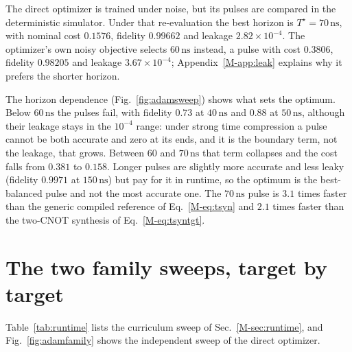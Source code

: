 \documentclass[aps,prx,twocolumn,superscriptaddress,nofootinbib,amsmath,amssymb,floatfix]{revtex4-2}
\newcommand{\ns}{\,\mathrm{ns}}
\begin{document}
The direct optimizer is trained under noise, but its pulses are compared in the deterministic simulator.
Under that re-evaluation the best horizon is $T^\star=70\ns$, with nominal cost $0.1576$, fidelity
$0.99662$ and leakage $2.82\times10^{-4}$. The optimizer's own noisy objective selects $60\ns$ instead, a
pulse with cost $0.3806$, fidelity $0.98205$ and leakage $3.67\times10^{-4}$; Appendix~\ref{M-app:leak}
explains why it prefers the shorter horizon.

The horizon dependence (Fig.~\ref{fig:adamsweep}) shows what sets the optimum. Below $60\ns$ the pulses
fail, with fidelity $0.73$ at $40\ns$ and $0.88$ at $50\ns$, although their leakage stays in the
$10^{-4}$ range: under strong time compression a pulse cannot be both accurate and zero at its ends, and
it is the boundary term, not the leakage, that grows. Between $60$ and $70\ns$ that term collapses and the
cost falls from $0.381$ to $0.158$. Longer pulses are slightly more accurate and less leaky (fidelity
$0.9971$ at $150\ns$) but pay for it in runtime, so the optimum is the best-balanced pulse and not the
most accurate one. The $70\ns$ pulse is $3.1$ times faster than the generic compiled reference of
Eq.~\eqref{M-eq:tsyn} and $2.1$ times faster than the two-CNOT synthesis of Eq.~\eqref{M-eq:tsyntgt}.

\section{The two family sweeps, target by target}
\label{app:curriculum}

Table~\ref{tab:runtime} lists the curriculum sweep of Sec.~\ref{M-sec:runtime}, and
Fig.~\ref{fig:adamfamily} shows the independent sweep of the direct optimizer.
\end{document}
